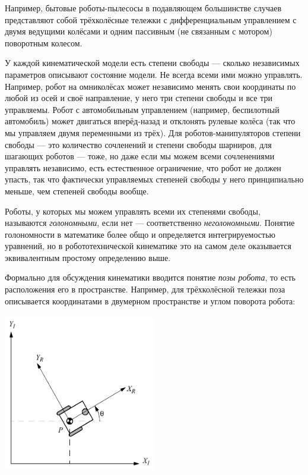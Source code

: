 \documentclass{../../text-style}
\begin{document}
Например, бытовые роботы-пылесосы в подавляющем большинстве случаев представляют собой трёхколёсные тележки с дифференциальным управлением с двумя ведущими колёсами и одним пассивным (не связанным с мотором) поворотным колесом.

У каждой кинематической модели есть степени свободы --- сколько независимых параметров описывают состояние модели.
Не всегда всеми ими можно управлять.
Например, робот на омниколёсах может независимо менять свои координаты по любой из осей и своё направление, у него три степени свободы и все три управляемы.
Робот с автомобильным управлением (например, беспилотный автомобиль) может двигаться вперёд-назад и отклонять рулевые колёса (так что мы управляем двумя переменными из трёх).
Для роботов-манипуляторов степени свободы --- это количество сочленений и степени свободы шарниров, для шагающих роботов --- тоже, но даже если мы можем всеми сочленениями управлять независимо, есть естественное ограничение, что робот не должен упасть, так что фактически управляемых степеней свободы у него принципиально меньше, чем степеней свободы вообще.

Роботы, у которых мы можем управлять всеми их степенями свободы, называются \emph{голономными}, если нет --- соответственно \emph{неголономными}.
Понятие голономности в математике более общо и определяется интегрируемостью уравнений, но в робототехнической кинематике это на самом деле оказывается эквивалентным простому определению выше.

Формально для обсуждения кинематики вводится понятие \emph{позы робота}, то есть расположения его в пространстве.
Например, для трёхколёсной тележки поза описывается координатами в двумерном пространстве и углом поворота робота:

\begin{center}
    \includegraphics[width=0.5\textwidth]{pose.png}
\end{center}
\end{document}
